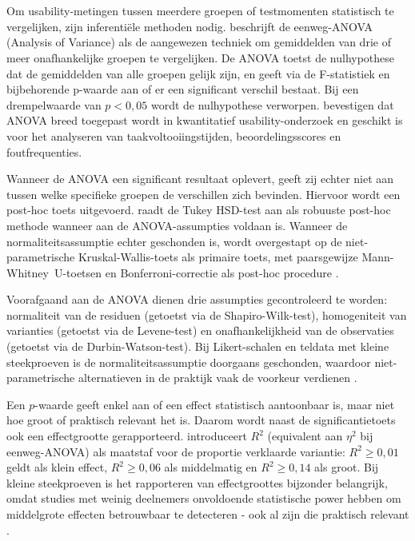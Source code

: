 \section{}
Om usability-metingen tussen meerdere groepen of testmomenten statistisch te vergelijken, zijn inferentiële methoden nodig. \textcite{Field2018} beschrijft de eenweg-ANOVA (Analysis of Variance) als de aangewezen techniek om gemiddelden van drie of meer onafhankelijke groepen te vergelijken. De ANOVA toetst de nulhypothese dat de gemiddelden van alle groepen gelijk zijn, en geeft via de F-statistiek en bijbehorende p-waarde aan of er een significant verschil bestaat. Bij een drempelwaarde van $p < 0{,}05$ wordt de nulhypothese verworpen. \textcite{SauroLewis2016} bevestigen dat ANOVA breed toegepast wordt in kwantitatief usability-onderzoek en geschikt is voor het analyseren van taakvoltooiingstijden, beoordelingsscores en foutfrequenties.

Wanneer de ANOVA een significant resultaat oplevert, geeft zij echter niet aan tussen welke specifieke groepen de verschillen zich bevinden. Hiervoor wordt een post-hoc toets uitgevoerd. \textcite{Field2018} raadt de Tukey HSD-test aan als robuuste post-hoc methode wanneer aan de ANOVA-assumpties voldaan is. Wanneer de normaliteitsassumptie echter geschonden is, wordt overgestapt op de niet-parametrische Kruskal-Wallis-toets als primaire toets, met paarsgewijze Mann-Whitney~U-toetsen en Bonferroni-correctie als post-hoc procedure \autocite{Field2018}.

Voorafgaand aan de ANOVA dienen drie assumpties gecontroleerd te worden: normaliteit van de residuen (getoetst via de Shapiro-Wilk-test), homogeniteit van varianties (getoetst via de Levene-test) en onafhankelijkheid van de observaties (getoetst via de Durbin-Watson-test). Bij Likert-schalen en teldata met kleine steekproeven is de normaliteitsassumptie doorgaans geschonden, waardoor niet-parametrische alternatieven in de praktijk vaak de voorkeur verdienen \autocite{SauroLewis2016}.

Een $p$-waarde geeft enkel aan of een effect statistisch aantoonbaar is, maar niet hoe groot of praktisch relevant het is. Daarom wordt naast de significantietoets ook een effectgrootte gerapporteerd. \textcite{Cohen1988} introduceert $R^2$ (equivalent aan $\eta^2$ bij eenweg-ANOVA) als maatstaf voor de proportie verklaarde variantie: $R^2 \geq 0{,}01$ geldt als klein effect, $R^2 \geq 0{,}06$ als middelmatig en $R^2 \geq 0{,}14$ als groot. Bij kleine steekproeven is het rapporteren van effectgroottes bijzonder belangrijk, omdat studies met weinig deelnemers onvoldoende statistische power hebben om middelgrote effecten betrouwbaar te detecteren - ook al zijn die praktisch relevant \autocite{Cohen1988}.


